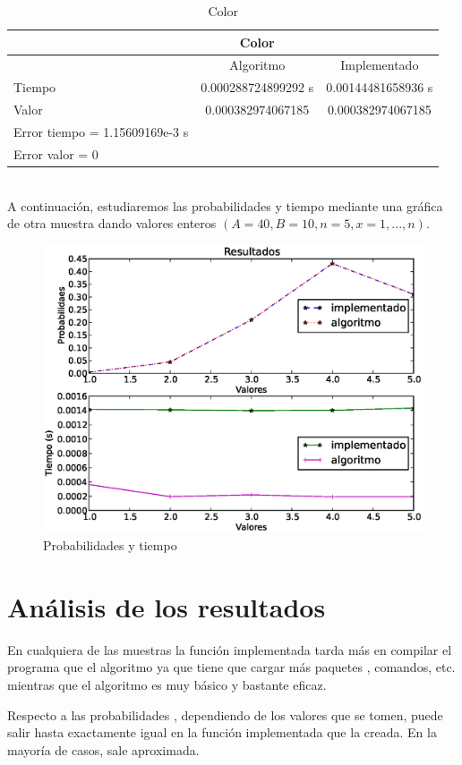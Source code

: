 \documentclass[spanish,a4paper,12pt]{report}
\begin{document}
\begin{table}[!ht]
\centering
\begin{tabular}{lcc}
& Color &\\
\hline
& Algoritmo & Implementado\\
Tiempo & 0.000288724899292 s & 0.00144481658936 s \\
Valor & 0.000382974067185 & 0.000382974067185\\
\hline
Error tiempo = 1.15609169e-3 s\\
Error valor = 0
\end{tabular}
\caption{Color}
\end{table}
\ \\
A continuación, estudiaremos las probabilidades y tiempo mediante una gráfica de otra muestra dando valores enteros $(A=40, B=10, n=5 ,x=1,...,n).$
\ \\
\begin{figure}[!ht]
\centering
\includegraphics[width=1.1\textwidth]{grafica.eps}
\caption{Probabilidades y tiempo}
\end{figure}




\section{Análisis de los resultados}
En cualquiera de las muestras la función implementada tarda más en compilar el programa que el algoritmo ya que tiene que cargar más paquetes , comandos, etc. mientras que el algoritmo es muy básico y bastante eficaz.

Respecto a las probabilidades , dependiendo de los valores que se tomen, puede salir hasta exactamente igual en la función implementada que la creada. En la mayoría de casos, sale aproximada.
\end{document}
